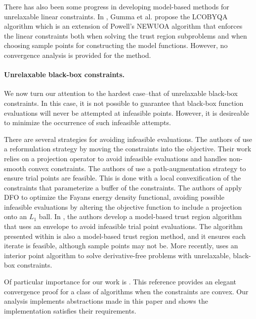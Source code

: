\documentclass{article}
\begin{document}
There has also been some progress in developing model-based methods for unrelaxable linear constraints.   In  \cite{gumma.hashim.ea:derivative-free},  Gumma et al.  propose the LCOBYQA algorithm which is an extension of Powell's NEWUOA algorithm that enforces the linear constraints both when solving the trust region subproblems and when choosing sample points for constructing the model functions.    However, no convergence analysis is provided for the method.   

\paragraph*{Unrelaxable black-box constraints.}   
We now turn our attention to the hardest case--that of unrelaxable black-box constraints.   In this case,  it is not possible to guarantee that black-box function evaluations will never be attempted at infeasible points.   However, it is desireable to minimize the occurrence of such infeasible attempts.  

There are several strategies for avoiding infeasible evaluations.
The authors of \cite{Galvan2021} use a reformulation strategy by moving the constraints into the objective.
Their work relies on a projection operator to avoid infeasible evaluations and handles non-smooth convex constraints.
The authors of \cite{NOWPAC2014} use a path-augmentation strategy to ensure trial points are feasible.
This is done with a local convexification of the constraints that parameterize a buffer of the constraints.
The authors of \cite{BMNORW2020} apply DFO to optimize the Fayans energy density functional, avoiding possible infeasible evaluations by altering the objective function to include a projection onto an $L_1$ ball.
In \cite{CONORBIT15}, the authors develop a model-based trust region algorithm that uses an envelope to avoid infeasible trial point evaluations.
The algorithm presented within \cite{Conejo2015} is also a model-based trust region method, and it ensures each iterate is feasible, although sample points may not be.
More recently, \cite{Brilli2021interior} uses an interior point algorithm to solve derivative-free problems with unrelaxable, black-box constraints.

Of particular importance for our work is \cite{Conejo:2013:GCT:2620806.2621814}.
This reference provides an elegant convergence proof for a class of algorithms when the constraints are convex.
Our analysis implements abstractions made in this paper and shows the implementation satisfies their requirements.
\end{document}
